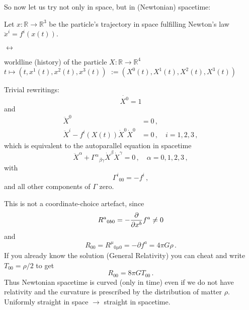 So now let us try not only in space, but in (Newtonian) spacetime:\\
\bigskip
\begin{minipage}{0.19\textwidth}
Let $x: \mathbb{R} \to \mathbb{R}^3$ be the particle's trajectory
in space fulfilling Newton's law $\ddot{x}^i = f^i(x(t))$.
\end{minipage}
\hfill
$\leftrightarrow$
\hfill
\begin{minipage}{0.25\textwidth}
    worldline (history) of the particle
    $X: \mathbb{R} \to \mathbb{R}^4$\\
    $t\mapsto (t, x^1(t), x^2(t), x^3(t))$
    $:= (X^0(t), X^1(t), X^2(t), X^3(t))$
\end{minipage}
Trivial rewritings:
\begin{equation}
    \dot{X^0} = 1
\end{equation}
and
\begin{align}
    \ddot{X}^0 &= 0\,,\\
    \ddot{X}^i - f^i(X(t))\dot{X}^0\dot{X}^0 &= 0\,,\quad i=1,2,3\,,
\end{align}
which is equivalent to
the autoparallel equation in spacetime
\begin{equation}
    \ddot{X}^\alpha + \Gamma^\alpha{}_{\beta \gamma} \dot{X}^\beta \dot{X}^\gamma = 0\,,\quad \alpha=0,1,2,3\,,
\end{equation}
with
\begin{equation}
    \Gamma^i{}_{00} = -f^i\,,
\end{equation}
and all other components of $\Gamma$ zero.

This is not a coordinate-choice artefact, since
\begin{equation}
    R^{a}{}_{0b0} = -\frac{\partial}{\partial x^b}f^a \neq 0\,\\
\end{equation}
and
\begin{equation}
    R_{00} = R^\mu{}_{0\mu 0} = -\partial f^a = 4\pi G \rho\,.
\end{equation}
If you already know the solution (General Relativity) you can cheat and write
$T_{00} = \rho/2$ to get
\begin{equation}
    R_{00} = 8 \pi G T_{00}\,.
    \label{eq:newtGR}
\end{equation}
Thus Newtonian spacetime is curved (only in time) even if we do not
have relativity and the curvature is prescribed by the distribution of
matter $\rho$.
Uniformly straight in space $\to$ straight in spacetime.

